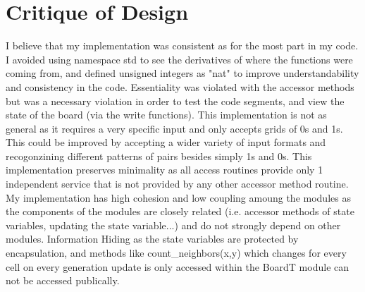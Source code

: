 \documentclass[12pt]{article}
\begin{document}
\newpage

\section*{Critique of Design}
I believe that my implementation was consistent as for the most part in my code. I avoided using namespace std to see the derivatives of where the functions were coming from, and defined unsigned integers as "nat" to improve understandability and consistency in the code. Essentiality was violated with the accessor methods but was a necessary violation in order to test the code segments, and view the state of the board (via the write functions). This implementation is not as general as it requires a very specific input and only accepts grids of 0s and 1s. This could be improved by accepting a wider variety of input formats and recogonzining different patterns of pairs besides simply 1s and 0s. This implementation preserves minimality as all access routines provide only 1 independent service that is not provided by any other accessor method routine. My implementation has high cohesion and low coupling amoung the modules as the components of the modules are closely related (i.e. accessor methods of state variables, updating the state variable...) and do not strongly depend on other modules. Information Hiding as the state variables are protected by encapsulation, and methods like count\_neighbors(x,y) which changes for every cell on every generation update is only accessed within the BoardT module can not be accessed publically.
\end{document}
